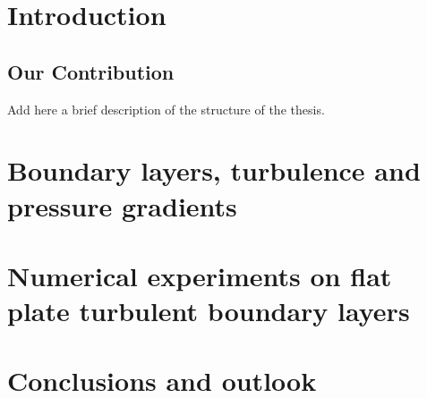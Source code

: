 \graphicspath{{imgs/}}

\chapter{Introduction}
%


\section{Our Contribution}
%


\thesisstructure Add here a brief description of the structure of the thesis.

\chapter{Boundary layers, turbulence and pressure gradients}
%


\chapter{Numerical experiments on flat plate turbulent boundary layers}
%


%
\chapter{Conclusions and outlook}
%



